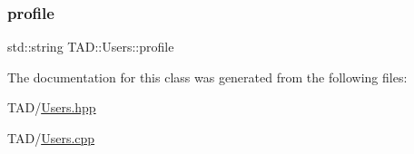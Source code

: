 \subsubsection{\texorpdfstring{profile}{profile}}
{\footnotesize\ttfamily std\+::string T\+A\+D\+::\+Users\+::profile\hspace{0.3cm}{\ttfamily [private]}}



The documentation for this class was generated from the following files\+:\begin{DoxyCompactItemize}
\item 
T\+A\+D/\hyperlink{_users_8hpp}{Users.\+hpp}\item 
T\+A\+D/\hyperlink{_users_8cpp}{Users.\+cpp}\end{DoxyCompactItemize}
